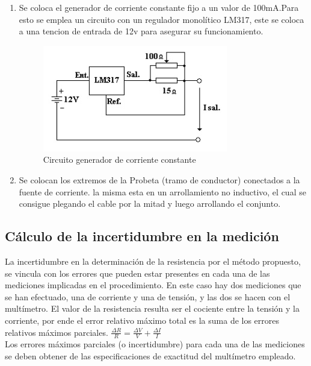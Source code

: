 \documentclass[12pt, letterpaper]{article}
\begin{document}
\begin{enumerate}
	\item Se coloca el generador de corriente constante fijo a un valor de 100mA.Para esto se emplea un circuito con un regulador monolítico
	LM317, este se coloca a una tencion de entrada de 12v para asegurar su funcionamiento.
	
	\begin{figure}[h]
		\centering
		\includegraphics{Imagenes/circuito_lm317.jpg}
		\caption{Circuito generador de corriente constante}
	\end{figure}

	\item Se colocan los extremos de la Probeta (tramo de conductor) conectados a la fuente de corriente. la misma esta en un 
	arrollamiento no inductivo, el cual se consigue plegando el cable por la mitad y luego arrollando el conjunto.

\end{enumerate}

\subsection{Cálculo de la incertidumbre en la medición}

La incertidumbre en la determinación de la resistencia por el método propuesto, se vincula con los 
errores que pueden estar presentes en cada una de las mediciones implicadas en el procedimiento. En 
este caso hay dos mediciones que se han efectuado, una de corriente y una de tensión, y las dos se 
hacen con el multímetro. El valor de la resistencia resulta ser el cociente entre la tensión y la 
corriente, por ende el error relativo máximo total es la suma de los errores relativos máximos parciales.
\singlespacing
$\frac{\Delta R}{R} = \frac{\Delta V}{V}+\frac{\Delta I}{I}$
\\
Los errores máximos parciales (o incertidumbre) para cada una de las mediciones se deben 
obtener de las especificaciones de exactitud del multímetro empleado. 
\end{document}
